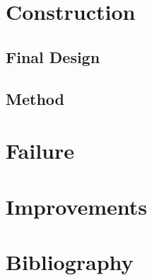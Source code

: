\documentclass[a4paper,11pt]{article}
\begin{document}
\section{Construction}

\subsection{Final Design}

\subsection{Method}



\section{Failure}

\section{Improvements}

\section{Bibliography}
\end{document}
